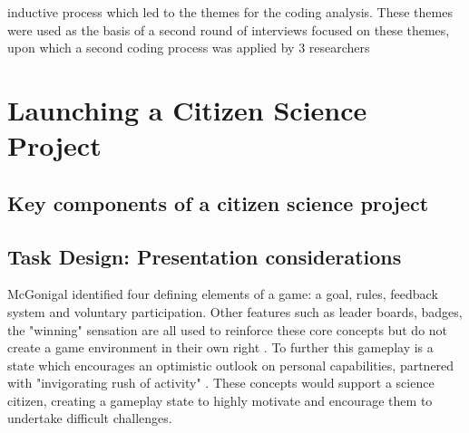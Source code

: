 \documentclass{sigchi}
\begin{document}
inductive process which led to the themes for the coding analysis.
These themes were used as the basis of a second round of interviews
focused on these themes, upon which a second coding process was
applied by 3 researchers

\section{Launching a Citizen Science Project}

\subsection{Key components of a citizen science project}
% 


\subsection{Task Design: Presentation considerations}
McGonigal identified four defining elements of a game: a goal, rules, feedback system and voluntary participation. Other features such as leader boards, badges, the "winning" sensation are all used to reinforce these core concepts but do not create a game environment in their own right \cite{mcgonigal2011reality}. To further this gameplay is a state which encourages an optimistic outlook on personal capabilities, partnered with "invigorating rush of activity" \cite{mcgonigal2011reality}. These concepts would support a science citizen, creating a gameplay state to highly motivate and encourage them to undertake difficult challenges. 



\end{document}
